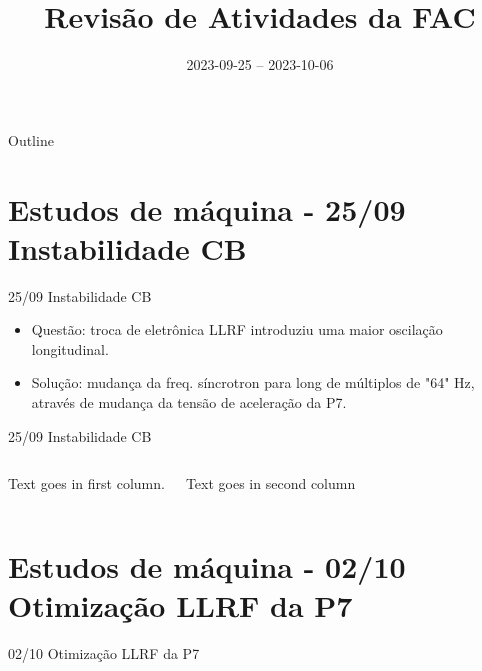 \documentclass{beamer}					%
\title{Revisão de Atividades da FAC}	%
\institute{LNLS.DAC.FAC}					%
\date{2023-09-25 -- 2023-10-06}									%
\begin{document}
\begin{frame}
  \titlepage
  \href{http://tex.stackexchange.com/q/20800/5701}{}
\end{frame}

\begin{frame}{Outline}
  \tableofcontents
\end{frame}

%

\section{Estudos de máquina - 25/09 Instabilidade CB}

\begin{frame}{25/09 Instabilidade CB}
    \begin{itemize}
		\item<1-> Questão: troca de eletrônica LLRF introduziu uma maior oscilação longitudinal.
        \item<2-> Solução: mudança da freq. síncrotron para long de múltiplos de "64" Hz, através de mudança da tensão de aceleração da P7.
	\end{itemize}
\end{frame}

\begin{frame}{25/09 Instabilidade CB}
	\begin{columns}
        Text goes in first column.
        
        Text goes in second column
	\end{columns}
\end{frame}

\section{Estudos de máquina - 02/10 Otimização LLRF da P7}

\begin{frame}{02/10 Otimização LLRF da P7}
	
\end{frame}
\end{document}
